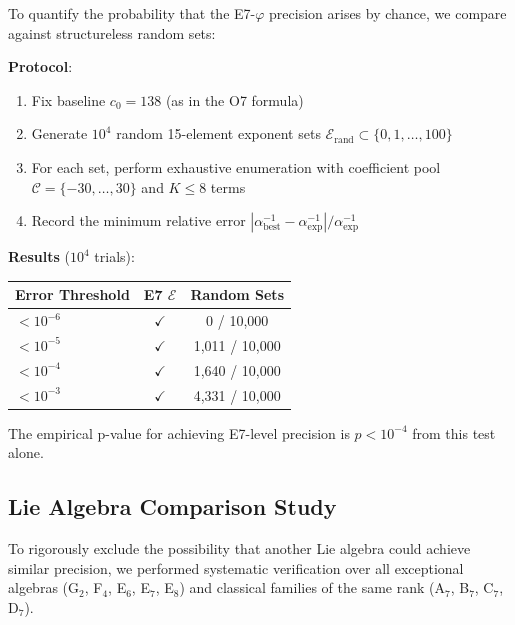 \documentclass[11pt,a4paper]{article}
\begin{document}
To quantify the probability that the E7-$\varphi$ precision arises by chance, we compare against structureless random sets:

\textbf{Protocol}:
\begin{enumerate}
\item Fix baseline $c_0 = 138$ (as in the O7 formula)
\item Generate $10^4$ random 15-element exponent sets $\mathcal{E}_{\text{rand}} \subset \{0, 1, \ldots, 100\}$
\item For each set, perform exhaustive enumeration with coefficient pool $\mathcal{C} = \{-30, \ldots, 30\}$ and $K \leq 8$ terms
\item Record the minimum relative error $|\alpha^{-1}_{\text{best}} - \alpha^{-1}_{\exp}|/\alpha^{-1}_{\exp}$
\end{enumerate}

\textbf{Results} ($10^4$ trials):
\begin{center}
\begin{tabular}{|l|c|c|}
\hline
\textbf{Error Threshold} & \textbf{E7 $\mathcal{E}$} & \textbf{Random Sets} \\
\hline
$< 10^{-6}$ & $\checkmark$ & 0 / 10,000 \\
$< 10^{-5}$ & $\checkmark$ & 1,011 / 10,000 \\
$< 10^{-4}$ & $\checkmark$ & 1,640 / 10,000 \\
$< 10^{-3}$ & $\checkmark$ & 4,331 / 10,000 \\
\hline
\end{tabular}
\end{center}

The empirical p-value for achieving E7-level precision is $p < 10^{-4}$ from this test alone.

\subsection{Lie Algebra Comparison Study}

To rigorously exclude the possibility that another Lie algebra could achieve similar precision, we performed systematic verification over all exceptional algebras (G$_2$, F$_4$, E$_6$, E$_7$, E$_8$) and classical families of the same rank (A$_7$, B$_7$, C$_7$, D$_7$).
\end{document}
